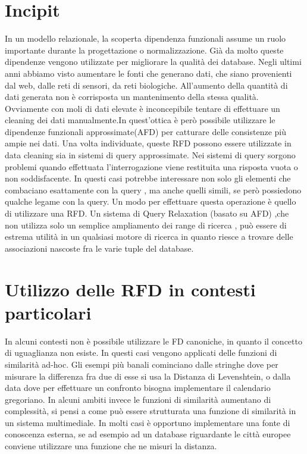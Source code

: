\section{Incipit}

In un modello relazionale, la scoperta dipendenza funzionali assume un ruolo importante durante la progettazione o normalizzazione. Già da molto queste dipendenze vengono utilizzate per migliorare la qualità dei database.
Negli ultimi anni abbiamo visto aumentare le fonti che generano dati, che siano provenienti dal web, dalle reti di sensori, da reti biologiche. All’aumento della quantità di dati generata non è corrisposta un mantenimento della stessa qualità. Ovviamente con moli di dati elevate è inconcepibile tentare di effettuare un cleaning dei dati manualmente.In quest’ottica è però possibile utilizzare le dipendenze funzionali approssimate(AFD) per catturare delle consistenze più ampie nei dati.
Una volta individuate, queste RFD possono essere utilizzate in data cleaning sia in sistemi di query approssimate. Nei sistemi di query sorgono problemi quando effettuata l'interrogazione viene restituita una risposta vuota o non soddisfacente. In questi casi potrebbe interessare non solo gli elementi che combaciano esattamente con la query , ma anche quelli simili, se però possiedono qualche legame con la query. Un modo per effettuare questa operazione è quello di utilizzare una RFD.
Un sistema di Query Relaxation (basato su AFD) ,che non utilizza solo un semplice ampliamento dei range di ricerca , può essere di estrema utilità in un qualsiasi motore di ricerca in quanto riesce a trovare delle associazioni nascoste fra le varie tuple del database.

\section{Utilizzo delle RFD in contesti particolari}

In alcuni contesti non è possibile utilizzare le FD canoniche, in quanto il concetto di uguaglianza non esiste. In questi casi vengono applicati delle funzioni di similarità ad-hoc. Gli esempi più banali cominciano dalle stringhe dove per misurare la differenza fra due di esse si usa la Distanza di Levenshtein, o dalla data  dove per effettuare un confronto bisogna implementare il calendario gregoriano. In alcuni ambiti invece le funzioni di similarità aumentano di complessità, si pensi a come può essere strutturata una funzione di similarità in un sistema multimediale. In molti casi è opportuno implementare una fonte di conoscenza esterna, se ad esempio ad un database riguardante le città europee conviene utilizzare una funzione che ne misuri la distanza. 

